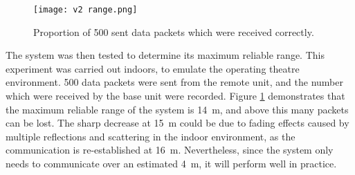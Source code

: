 \begin{figure}[htb]
	\centering
	\texttt{[image: v2 range.png]}
	\caption{Proportion of 500 sent data packets which were received correctly.}
	\label{fig: range}
\end{figure}

The system was then tested to determine its maximum reliable range. This experiment was carried out indoors, to emulate the operating theatre environment. 500 data packets were sent from the remote unit, and the number which were received by the base unit were recorded. Figure \ref{fig: range} demonstrates that the maximum reliable range of the system is \SI{14}{\metre}, and above this many packets can be lost. The sharp decrease at \SI{15}{\metre} could be due to fading effects caused by multiple reflections and scattering in the indoor environment, as the communication is re-established at \SI{16}{\metre}. Nevertheless, since the system only needs to communicate over an estimated \SI{4}{\metre}, it will perform well in practice.








